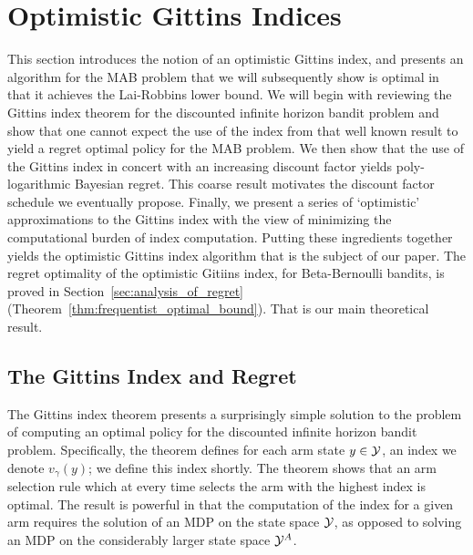 \section{Optimistic Gittins Indices} \label{sec:gittins_and_approx}

This section introduces the notion of an optimistic Gittins index, and presents an algorithm for the MAB problem that we will subsequently show is optimal in that it achieves the Lai-Robbins lower bound. We will begin with reviewing the Gittins index theorem for the discounted infinite horizon bandit problem and show that one cannot expect the use of the index from that well known result to yield a regret optimal policy for the MAB problem. We then show that the use of the Gittins index in concert with an increasing discount factor yields poly-logarithmic Bayesian regret. This coarse result motivates the discount factor schedule we eventually propose. Finally, we present a series of `optimistic' approximations to the Gittins index with the view of minimizing the computational burden of index computation. Putting these ingredients together yields the optimistic Gittins index algorithm that is the subject of our paper. The regret optimality of the optimistic Gitiins index, for Beta-Bernoulli bandits, is proved in Section~\ref{sec:analysis_of_regret} (Theorem~\ref{thm:frequentist_optimal_bound}). That is our main theoretical result. 

\subsection{The Gittins Index and Regret}

The Gittins index theorem presents a surprisingly simple solution to the problem of computing an optimal policy for the discounted infinite horizon bandit problem. Specifically, the theorem defines for each arm state $y \in \mathcal Y$, an index we denote $v_\gamma(y)$; we define this index shortly. The theorem shows that an arm selection rule which at every time selects the arm with the highest index is optimal. The result is powerful in that the computation of the index for a given arm requires the solution of an MDP on the state space $\mathcal Y$, as opposed to solving an MDP on the considerably larger state space $\mathcal Y^A$. 

